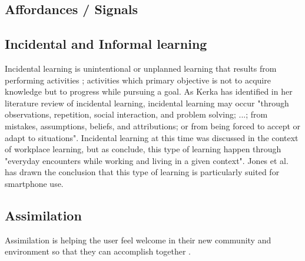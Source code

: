 \subsection{Affordances / Signals}

\subsection{Incidental and Informal learning}
Incidental learning is unintentional or unplanned learning that results from performing activities \cite{Kerka2000}; activities which primary objective is not to acquire knowledge but to progress while pursuing a goal. As Kerka \cite{Kerka2000} has identified in her literature review of incidental learning, incidental learning may occur "through observations, repetition, social interaction, and problem solving; ...; from mistakes, assumptions, beliefs, and attributions; or from being forced to accept or adapt to situations". Incidental learning at this time was discussed in the context of workplace learning, but as \cite{Marsick2001} conclude, this type of learning happen through "everyday encounters while working and living in a given context". Jones et al. \cite{Jones2014} has drawn the conclusion that this type of learning is particularly suited for smartphone use.

\subsection{Assimilation}
Assimilation is helping the user feel welcome in their new community and environment so that they can accomplish together \cite{Bradt2009}.

